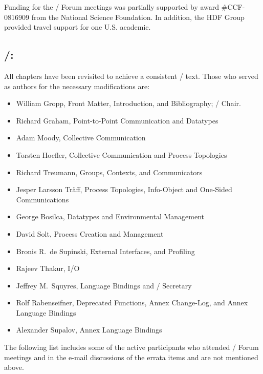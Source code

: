 \medskip

Funding for the \MPI/ Forum meetings was partially supported by award
\#CCF-0816909 from the National Science Foundation.   
In addition, the HDF Group provided travel support for one
U.S. academic.

\medskip
 
\subsection*{\MPIIIDOTII/:} 
All chapters have been revisited to achieve a consistent \MPIIIDOTII/ text.
Those who served as authors for the necessary modifications are:
\begin{itemize} 
\item William Gropp, Front Matter, Introduction, and Bibliography; 
\MPIIIDOTII/ Chair. 
\item Richard Graham, Point-to-Point Communication and Datatypes
\item Adam Moody, Collective Communication
\item Torsten Hoefler, Collective Communication and Process Topologies
\item Richard Treumann, Groups, Contexts, and Communicators
\item Jesper Larsson Tr\"aff, Process Topologies, Info-Object
      and One-Sided Communications
\item George Bosilca, Datatypes and Environmental Management
\item David Solt, Process Creation and Management
\item Bronis R.~de Supinski, External Interfaces, and Profiling
\item Rajeev Thakur, I/O
\item Jeffrey M.~Squyres, Language Bindings and \MPIIIDOTII/ Secretary
\item Rolf Rabenseifner, Deprecated Functions, Annex Change-Log, and Annex 
Language Bindings 
\item Alexander Supalov, Annex Language Bindings
\end{itemize} 

The following list includes some of the active participants who
attended \MPIII/ Forum meetings and in the e-mail discussions
of the errata items and are not mentioned above.

